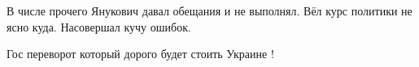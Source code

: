 \begin{itemize}

В числе прочего Янукович давал обещания и не выполнял.
Вёл курс политики не ясно куда.
Насовершал кучу ошибок.


Гос переворот который дорого будет стоить Украине !




\end{itemize} %
